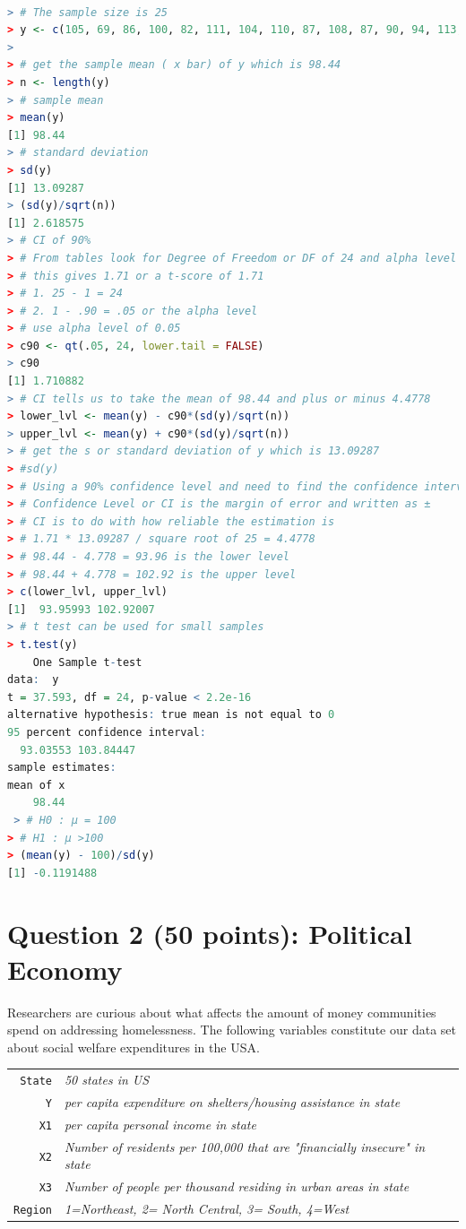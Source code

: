 \documentclass[12pt,letterpaper]{article}
\begin{document}
\begin{lstlisting}[language=R]

> # The sample size is 25
> y <- c(105, 69, 86, 100, 82, 111, 104, 110, 87, 108, 87, 90, 94, 113, 112, 98, 80, 97, 95, 111, 114, 89, 95, 126, 98)
> 
> # get the sample mean ( x bar) of y which is 98.44
> n <- length(y) 
> # sample mean
> mean(y)
[1] 98.44
> # standard deviation
> sd(y)
[1] 13.09287
> (sd(y)/sqrt(n))
[1] 2.618575
> # CI of 90%
> # From tables look for Degree of Freedom or DF of 24 and alpha level of 0.05
> # this gives 1.71 or a t-score of 1.71
> # 1. 25 - 1 = 24
> # 2. 1 - .90 = .05 or the alpha level
> # use alpha level of 0.05
> c90 <- qt(.05, 24, lower.tail = FALSE)
> c90
[1] 1.710882
> # CI tells us to take the mean of 98.44 and plus or minus 4.4778
> lower_lvl <- mean(y) - c90*(sd(y)/sqrt(n))
> upper_lvl <- mean(y) + c90*(sd(y)/sqrt(n))
> # get the s or standard deviation of y which is 13.09287
> #sd(y)
> # Using a 90% confidence level and need to find the confidence interval
> # Confidence Level or CI is the margin of error and written as ±
> # CI is to do with how reliable the estimation is
> # 1.71 * 13.09287 / square root of 25 = 4.4778
> # 98.44 - 4.778 = 93.96 is the lower level
> # 98.44 + 4.778 = 102.92 is the upper level
> c(lower_lvl, upper_lvl)
[1]  93.95993 102.92007
> # t test can be used for small samples
> t.test(y)
	One Sample t-test
data:  y
t = 37.593, df = 24, p-value < 2.2e-16
alternative hypothesis: true mean is not equal to 0
95 percent confidence interval:
  93.03553 103.84447
sample estimates:
mean of x 
    98.44 
 > # H0 : μ = 100
> # H1 : μ >100
> (mean(y) - 100)/sd(y)
[1] -0.1191488

\end{lstlisting}

\newpage

	\section*{Question 2 (50 points): Political Economy}

\noindent Researchers are curious about what affects the amount of money communities spend on addressing homelessness. The following variables constitute our data set about social welfare expenditures in the USA. \\
\vspace{.5cm}


\begin{tabular}{r|l}
	\texttt{State} &\emph{50 states in US} \\
	\texttt{Y} & \emph{per capita expenditure on shelters/housing assistance in state}\\
	\texttt{X1} &\emph{per capita personal income in state} \\
	\texttt{X2} &  \emph{Number of residents per 100,000 that are "financially insecure" in state}\\
	\texttt{X3} &  \emph{Number of people per thousand residing in urban areas in state} \\
	\texttt{Region} &  \emph{1=Northeast, 2= North Central, 3= South, 4=West} \\
\end{tabular}
\end{document}

